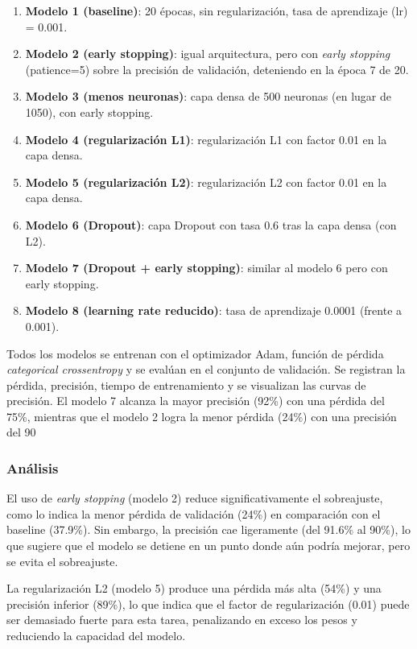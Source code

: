 \documentclass[12pt]{article}
\begin{document}
\begin{enumerate}
\item \textbf{Modelo 1 (baseline)}: 20 épocas, sin regularización, tasa de aprendizaje (lr) = 0.001.
\item \textbf{Modelo 2 (early stopping)}: igual arquitectura, pero con \textit{early stopping} (patience=5) sobre la precisión de validación, deteniendo en la época 7 de 20.
\item \textbf{Modelo 3 (menos neuronas)}: capa densa de 500 neuronas (en lugar de 1050), con early stopping.
\item \textbf{Modelo 4 (regularización L1)}: regularización L1 con factor 0.01 en la capa densa.
\item \textbf{Modelo 5 (regularización L2)}: regularización L2 con factor 0.01 en la capa densa.
\item \textbf{Modelo 6 (Dropout)}: capa Dropout con tasa 0.6 tras la capa densa (con L2).
\item \textbf{Modelo 7 (Dropout + early stopping)}: similar al modelo 6 pero con early stopping.
\item \textbf{Modelo 8 (learning rate reducido)}: tasa de aprendizaje 0.0001 (frente a 0.001).
\end{enumerate}

Todos los modelos se entrenan con el optimizador Adam, función de pérdida \textit{categorical crossentropy} y se evalúan en el conjunto de validación. Se registran la pérdida, precisión, tiempo de entrenamiento y se visualizan las curvas de precisión.
El modelo 7 alcanza la mayor precisión (92\%) con una pérdida del 75\%, mientras que el modelo 2 logra la menor pérdida (24\%) con una precisión del 90%

\subsubsection*{Análisis}

El uso de \textit{early stopping} (modelo 2) reduce significativamente el sobreajuste, como lo indica la menor pérdida de validación (24\%) en comparación con el baseline (37.9\%). Sin embargo, la precisión cae ligeramente (del 91.6\% al 90\%), lo que sugiere que el modelo se detiene en un punto donde aún podría mejorar, pero se evita el sobreajuste.

La regularización L2 (modelo 5) produce una pérdida más alta (54\%) y una precisión inferior (89\%), lo que indica que el factor de regularización (0.01) puede ser demasiado fuerte para esta tarea, penalizando en exceso los pesos y reduciendo la capacidad del modelo.
\end{document}

